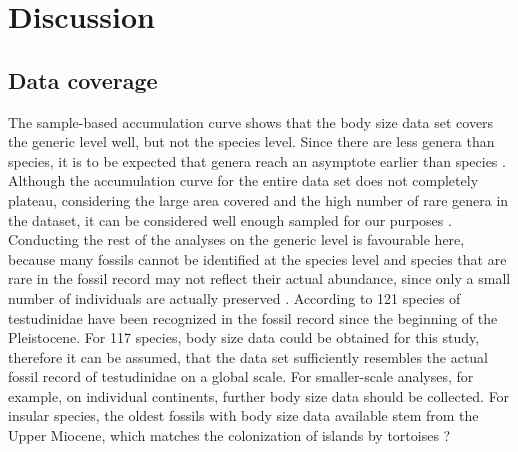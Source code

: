 \section{Discussion}

\subsection{Data coverage}
The sample-based accumulation curve shows that the body size data set covers the generic level well, but not the species level.
Since there are less genera than species, it is to be expected that genera reach an asymptote earlier than species \citep{Gotelli2001}.
Although the accumulation curve for the entire data set does not completely plateau, considering the large area covered \citep{Thompson2002} and the high number of rare genera in the dataset, it can be considered well enough sampled for our purposes \citep{Gotelli2001}.
Conducting the rest of the analyses on the generic level is favourable here, because many fossils cannot be identified at the species level and species that are rare in the fossil record may not reflect their actual abundance, since only a small number of individuals are actually preserved \citep{Jass2014}.
According to \cite{Rhodin2015} 121 species of testudinidae have been recognized in the fossil record since the beginning of the Pleistocene. For 117 species, body size data could be obtained for this study, therefore it can be assumed, that the data set sufficiently resembles the actual fossil record of testudinidae on a global scale.
For smaller-scale analyses, for example, on individual continents, further body size data should be collected.
For insular species, the oldest fossils with body size data available stem from the Upper Miocene, which matches the colonization of islands by tortoises ? \citep{.}



%

